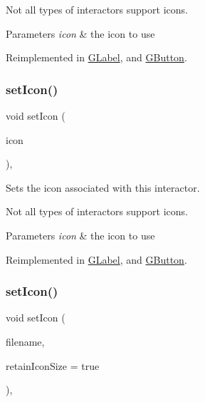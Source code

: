 Not all types of interactors support icons. 
\begin{DoxyParams}{Parameters}
{\em icon} & the icon to use \\
\hline
\end{DoxyParams}


Reimplemented in \mbox{\hyperlink{classGLabel_acca97b6c6330abded1c80521c9aca3a6}{G\+Label}}, and \mbox{\hyperlink{classGButton_acca97b6c6330abded1c80521c9aca3a6}{G\+Button}}.

\mbox{\label{classGInteractor_a368e1a338f84401c284506d03b1ba769}} 
\subsubsection{\texorpdfstring{set\+Icon()}{setIcon()}\hspace{0.1cm}{\footnotesize\ttfamily [2/3]}}
{\footnotesize\ttfamily void set\+Icon (\begin{DoxyParamCaption}\item[{const Q\+Pixmap \&}]{icon }\end{DoxyParamCaption})\hspace{0.3cm}{\ttfamily [virtual]}, {\ttfamily [inherited]}}



Sets the icon associated with this interactor. 

Not all types of interactors support icons. 
\begin{DoxyParams}{Parameters}
{\em icon} & the icon to use \\
\hline
\end{DoxyParams}


Reimplemented in \mbox{\hyperlink{classGLabel_acb5275b880ff622d306f8f33428b4e34}{G\+Label}}, and \mbox{\hyperlink{classGButton_acb5275b880ff622d306f8f33428b4e34}{G\+Button}}.

\mbox{\label{classGInteractor_a762e139aa311461c3984d3ad28293f64}} 
\subsubsection{\texorpdfstring{set\+Icon()}{setIcon()}\hspace{0.1cm}{\footnotesize\ttfamily [3/3]}}
{\footnotesize\ttfamily void set\+Icon (\begin{DoxyParamCaption}\item[{const std\+::string \&}]{filename,  }\item[{bool}]{retain\+Icon\+Size = {\ttfamily true} }\end{DoxyParamCaption})\hspace{0.3cm}{\ttfamily [virtual]}, {\ttfamily [inherited]}}



